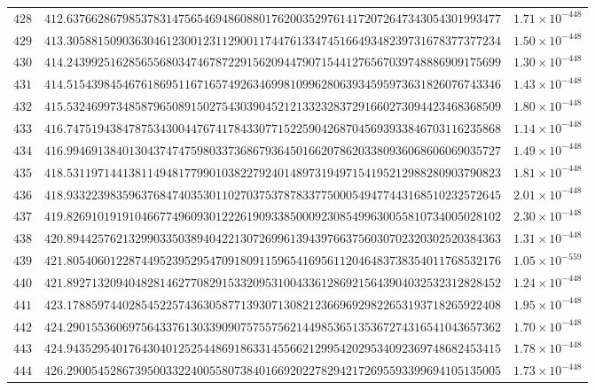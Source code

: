 \documentclass[12pt,reqno]{amsart}
\theoremstyle{remark}
\begin{document}
\begin{longtable}{clc}
$428$ & $412.6376628679853783147565469486088017620035297614172072647343054301993477$ & $1.71\times 10^{-448}$ \\
$429$ & $413.3058815090363046123001231129001174476133474516649348239731678377377234$ & $1.50\times 10^{-448}$ \\
$430$ & $414.2439925162856556803474678722915620944790715441276567039748886909175699$ & $1.30\times 10^{-448}$ \\
$431$ & $414.5154398454676186951167165749263469981099628063934595973631826076743346$ & $1.43\times 10^{-448}$ \\
$432$ & $415.5324699734858796508915027543039045212133232837291660273094423468368509$ & $1.80\times 10^{-448}$ \\
$433$ & $416.7475194384787534300447674178433077152259042687045693933846703116235868$ & $1.14\times 10^{-448}$ \\
$434$ & $416.9946913840130437474759803373686793645016620786203380936068606069035727$ & $1.49\times 10^{-448}$ \\
$435$ & $418.5311971441381149481779901038227924014897319497154195212988280903790823$ & $1.81\times 10^{-448}$ \\
$436$ & $418.9332239835963768474035301102703753787833775000549477443168510232572645$ & $2.01\times 10^{-448}$ \\
$437$ & $419.8269101919104667749609301222619093385000923085499630055810734005028102$ & $2.30\times 10^{-448}$ \\
$438$ & $420.8944257621329903350389404221307269961394397663756030702320302520384363$ & $1.31\times 10^{-448}$ \\
$439$ & $421.8054060122874495239529547091809115965416956112046483738354011768532176$ & $1.05\times 10^{-559}$ \\
$440$ & $421.8927132094048281462770829153320953100433612869215643904032532312828452$ & $1.24\times 10^{-448}$ \\
$441$ & $423.1788597440285452257436305877139307130821236696929822653193718265922408$ & $1.95\times 10^{-448}$ \\
$442$ & $424.2901553606975643376130339090757557562144985365135367274316541043657362$ & $1.70\times 10^{-448}$ \\
$443$ & $424.9435295401764304012525448691863314556621299542029534092369748682453415$ & $1.78\times 10^{-448}$ \\
$444$ & $426.2900545286739500332240055807384016692022782942172695593399694105135005$ & $1.73\times 10^{-448}$ \\

\end{longtable}
\end{document}
